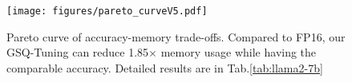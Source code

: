\begin{figure}[t]
  \centering
   \texttt{[image: figures/pareto\_curveV5.pdf]}
   \caption{Pareto curve of accuracy-memory trade-offs. Compared to FP16, our GSQ-Tuning can reduce 1.85$\times$ memory usage while having the comparable accuracy. Detailed results are in Tab.\ref{tab:llama2-7b}}
    \label{fig:pareto}
\end{figure}